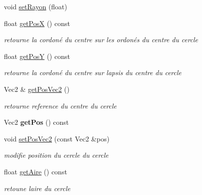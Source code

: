 \begin{DoxyCompactItemize}
void \mbox{\hyperlink{class_cercle_aa8a8df2a669f39962bbaac2da474e401}{set\+Rayon}} (float)
\item 
\mbox{\label{class_cercle_abc75c79032c4669d3bd30b9d504ee001}} 
float \mbox{\hyperlink{class_cercle_abc75c79032c4669d3bd30b9d504ee001}{get\+PosX}} () const
\begin{DoxyCompactList}\small\item\em retourne la cordoné du centre sur les ordonés du centre du cercle \end{DoxyCompactList}\item 
\mbox{\label{class_cercle_a09afc777ccf16b4d9061a984b5c13b4d}} 
float \mbox{\hyperlink{class_cercle_a09afc777ccf16b4d9061a984b5c13b4d}{get\+PosY}} () const
\begin{DoxyCompactList}\small\item\em retourne la cordoné du centre sur l\textquotesingle{}apsis du centre du cercle \end{DoxyCompactList}\item 
\mbox{\label{class_cercle_afe35d84f067ab109478c19daaad9a548}} 
Vec2 \& \mbox{\hyperlink{class_cercle_afe35d84f067ab109478c19daaad9a548}{get\+Pos\+Vec2}} ()
\begin{DoxyCompactList}\small\item\em retourne reference du centre du cercle \end{DoxyCompactList}\item 
\mbox{\label{class_cercle_a475082f684494cd27dd67aa4d5ea1240}} 
Vec2 {\bfseries get\+Pos} () const
\item 
\mbox{\label{class_cercle_ad0763171e600c21e5bf8293c0c9bb9c7}} 
void \mbox{\hyperlink{class_cercle_ad0763171e600c21e5bf8293c0c9bb9c7}{set\+Pos\+Vec2}} (const Vec2 \&pos)
\begin{DoxyCompactList}\small\item\em modifie position du cercle du cercle \end{DoxyCompactList}\item 
\mbox{\label{class_cercle_a866e2d2e46f87ad18afe4434da3b13d3}} 
float \mbox{\hyperlink{class_cercle_a866e2d2e46f87ad18afe4434da3b13d3}{get\+Aire}} () const
\begin{DoxyCompactList}\small\item\em retoune l\textquotesingle{}aire du cercle \end{DoxyCompactList}\item 

\end{DoxyCompactItemize}

